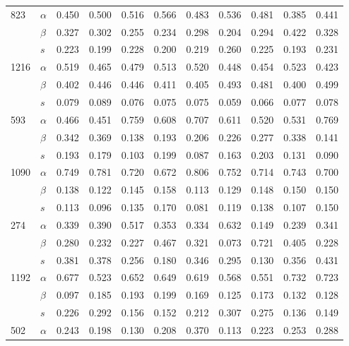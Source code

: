 \begin{longtable}{llrrrrrrrrr}
\cline{1-11}
\multirow{3}{*}{823} & $\alpha$ & 0.450 & 0.500 & 0.516 & 0.566 & 0.483 & 0.536 & 0.481 & 0.385 & 0.441 \\
     & $\beta$ & 0.327 & 0.302 & 0.255 & 0.234 & 0.298 & 0.204 & 0.294 & 0.422 & 0.328 \\
     & $s$ & 0.223 & 0.199 & 0.228 & 0.200 & 0.219 & 0.260 & 0.225 & 0.193 & 0.231 \\
\cline{1-11}
\multirow{3}{*}{1216} & $\alpha$ & 0.519 & 0.465 & 0.479 & 0.513 & 0.520 & 0.448 & 0.454 & 0.523 & 0.423 \\
     & $\beta$ & 0.402 & 0.446 & 0.446 & 0.411 & 0.405 & 0.493 & 0.481 & 0.400 & 0.499 \\
     & $s$ & 0.079 & 0.089 & 0.076 & 0.075 & 0.075 & 0.059 & 0.066 & 0.077 & 0.078 \\
\cline{1-11}
\multirow{3}{*}{593} & $\alpha$ & 0.466 & 0.451 & 0.759 & 0.608 & 0.707 & 0.611 & 0.520 & 0.531 & 0.769 \\
     & $\beta$ & 0.342 & 0.369 & 0.138 & 0.193 & 0.206 & 0.226 & 0.277 & 0.338 & 0.141 \\
     & $s$ & 0.193 & 0.179 & 0.103 & 0.199 & 0.087 & 0.163 & 0.203 & 0.131 & 0.090 \\
\cline{1-11}
\multirow{3}{*}{1090} & $\alpha$ & 0.749 & 0.781 & 0.720 & 0.672 & 0.806 & 0.752 & 0.714 & 0.743 & 0.700 \\
     & $\beta$ & 0.138 & 0.122 & 0.145 & 0.158 & 0.113 & 0.129 & 0.148 & 0.150 & 0.150 \\
     & $s$ & 0.113 & 0.096 & 0.135 & 0.170 & 0.081 & 0.119 & 0.138 & 0.107 & 0.150 \\
\cline{1-11}
\multirow{3}{*}{274} & $\alpha$ & 0.339 & 0.390 & 0.517 & 0.353 & 0.334 & 0.632 & 0.149 & 0.239 & 0.341 \\
     & $\beta$ & 0.280 & 0.232 & 0.227 & 0.467 & 0.321 & 0.073 & 0.721 & 0.405 & 0.228 \\
     & $s$ & 0.381 & 0.378 & 0.256 & 0.180 & 0.346 & 0.295 & 0.130 & 0.356 & 0.431 \\
\cline{1-11}
\multirow{3}{*}{1192} & $\alpha$ & 0.677 & 0.523 & 0.652 & 0.649 & 0.619 & 0.568 & 0.551 & 0.732 & 0.723 \\
     & $\beta$ & 0.097 & 0.185 & 0.193 & 0.199 & 0.169 & 0.125 & 0.173 & 0.132 & 0.128 \\
     & $s$ & 0.226 & 0.292 & 0.156 & 0.152 & 0.212 & 0.307 & 0.275 & 0.136 & 0.149 \\
\cline{1-11}
\multirow{3}{*}{502} & $\alpha$ & 0.243 & 0.198 & 0.130 & 0.208 & 0.370 & 0.113 & 0.223 & 0.253 & 0.288 \\

\end{longtable}
